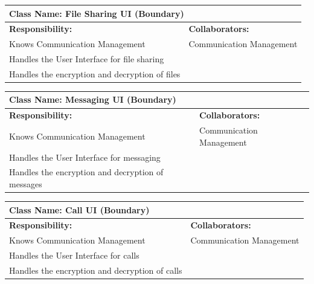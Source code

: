 \documentclass[]{article}
\begin{document}
\begin{table}[ht]
	\centering
	\begin{tabular}{|p{7cm}|p{7cm}|}
		\hline
		\multicolumn{2}{|l|}{\textbf{Class Name:} File Sharing UI (Boundary)}     \\
		\hline
		\textbf{Responsibility:}                       & \textbf{Collaborators:}  \\
		\hline
		Knows Communication Management                 & Communication Management \\
		Handles the User Interface for file sharing    &                          \\
		Handles the encryption and decryption of files &                          \\
		\hline
	\end{tabular}
\end{table}

\begin{table}[ht]
	\centering
	\begin{tabular}{|p{7cm}|p{7cm}|}
		\hline
		\multicolumn{2}{|l|}{\textbf{Class Name:} Messaging UI (Boundary)}           \\
		\hline
		\textbf{Responsibility:}                          & \textbf{Collaborators:}  \\
		\hline
		Knows Communication Management                    & Communication Management \\
		Handles the User Interface for messaging          &                          \\
		Handles the encryption and decryption of messages &                          \\
		\hline
	\end{tabular}
\end{table}

\begin{table}[ht]
	\centering
	\begin{tabular}{|p{7cm}|p{7cm}|}
		\hline
		\multicolumn{2}{|l|}{\textbf{Class Name:} Call UI (Boundary)}             \\
		\hline
		\textbf{Responsibility:}                       & \textbf{Collaborators:}  \\
		\hline
		Knows Communication Management                 & Communication Management \\
		Handles the User Interface for calls           &                          \\
		Handles the encryption and decryption of calls &                          \\
		\hline
	\end{tabular}
\end{table}
\end{document}
